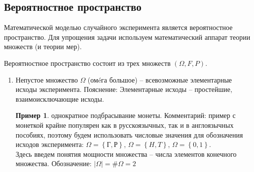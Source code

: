 \documentclass[a4paper, 12pt]{article}
\begin{document}
	\subsection{Вероятностное пространство}
	Математической моделью случайного эксперимента является вероятностное пространство. Для упрощения задачи используем математический аппарат теории множеств (и теории мер).\par
	Вероятностное пространство состоит из трех множеств $\left(\Omega, F, P\right)$.
	\begin{enumerate}
		\item Непустое множество $\Omega$ (омéга большое) – всевозможные элементарные исходы эксперимента. Пояснение: Элементарные исходы – простейшие, взаимоисключающие исходы.
		\theoremstyle{definition}
		\newtheorem{exmp}{Пример}[section]
		\begin{exmp}
		однократное подбрасывание монеты. Комментарий: пример с монеткой крайне популярен как в русскоязычных, так и в англоязычных пособиях, поэтому будем использовать числовые значения для обозначения исходов эксперимента: $\Omega=\left\{\text{Г},\text{Р}\right\}$, $\Omega=\left\{H,T\right\}$, $\Omega=\left\{0,1\right\}$.\\
		Здесь введем понятия мощности множества – числа элементов конечного множества. Обозначение: $\left|\Omega\right|=\#\Omega=2$
		\end{exmp}
		
	\end{enumerate}
\end{document}

